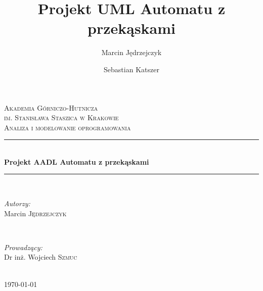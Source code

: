 \documentclass[a4paper, 11pt]{article}
\author{Marcin Jędrzejczyk \and Sebastian Katszer }
\title{Projekt UML Automatu z przekąskami }
\newcommand{\HRule}{\rule{\linewidth}{0.5mm}} %
\begin{document}
\begin{titlepage}


\center %

\textsc{\LARGE Akademia Górniczo-Hutnicza    \\im. Stanisława Staszica w Krakowie}\\[1.5cm] %
\textsc{\Large Analiza i modelowanie oprogramowania}\\[0.5cm] %


\HRule \\[0.4cm]
{ \huge \bfseries Projekt AADL Automatu z przekąskami}\\[0.4cm] %
\HRule \\[5.5cm]
 

\begin{minipage}{0.4\textwidth}
\begin{flushleft} \large 
\emph{Autorzy:}\\
Marcin \textsc{Jędrzejczyk} \\


\end{flushleft}
\end{minipage}
~
\begin{minipage}{0.4\textwidth}
\begin{flushright} \large
\emph{Prowadzący:}\\
 Dr inż. Wojciech \textsc{Szmuc} %
\end{flushright}
\end{minipage} \\[5cm]

{\large \today}\\[3cm]
\vfill
\end{titlepage}
\newpage
\end{document}
